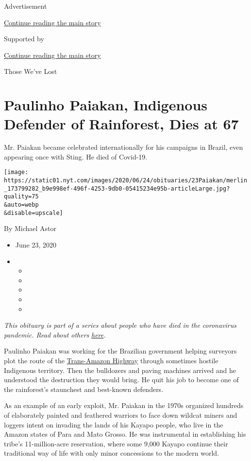 Advertisement

\protect\hyperlink{after-top}{Continue reading the main story}

Supported by

\protect\hyperlink{after-sponsor}{Continue reading the main story}

Those We've Lost

\hypertarget{paulinho-paiakan-indigenous-defender-of-rainforest-dies-at-67}{%
\section{Paulinho Paiakan, Indigenous Defender of Rainforest, Dies at
67}\label{paulinho-paiakan-indigenous-defender-of-rainforest-dies-at-67}}

Mr. Paiakan became celebrated internationally for his campaigns in
Brazil, even appearing once with Sting. He died of Covid-19.

\texttt{[image: https://static01.nyt.com/images/2020/06/24/obituaries/23Paiakan/merlin\_173799282\_b9e998ef-496f-4253-9db0-05415234e95b-articleLarge.jpg?quality=75\\\&auto=webp\\\&disable=upscale]}

By Michael Astor

\begin{itemize}
\item
  June 23, 2020
\item
  \begin{itemize}
  \item
  \item
  \item
  \item
  \item
  \end{itemize}
\end{itemize}

\emph{This obituary is part of a series about people who have died in
the coronavirus pandemic. Read about others}
\href{https://www.nytimes.com/interactive/2020/obituaries/people-died-coronavirus-obituaries.html}{\emph{here}}\emph{.}

Paulinho Paiakan was working for the Brazilian government helping
surveyors plot the route of the
\href{https://www.youtube.com/watch?v=pDssyllVegw}{Trans-Amazon Highway}
through sometimes hostile Indigenous territory. Then the bulldozers and
paving machines arrived and he understood the destruction they would
bring. He quit his job to become one of the rainforest's staunchest and
best-known defenders.

As an example of an early exploit, Mr. Paiakan in the 1970s organized
hundreds of elaborately painted and feathered warriors to face down
wildcat miners and loggers intent on invading the lands of his Kayapo
people, who live in the Amazon states of Para and Mato Grosso. He was
instrumental in establishing his tribe's 11-million-acre reservation,
where some 9,000 Kayapo continue their traditional way of life with only
minor concessions to the modern world.

